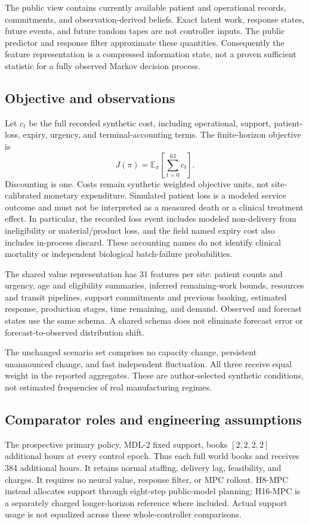 \documentclass[preprint,review,12pt]{elsarticle}
\begin{document}
The public view contains currently available patient and operational records,
commitments, and observation-derived beliefs. Exact latent work, response
states, future events, and future random tapes are not controller inputs.
The public predictor and response filter approximate these quantities.
Consequently the feature representation is a compressed information state,
not a proven sufficient statistic for a fully observed Markov decision process.

\subsection{Objective and observations}
Let $c_t$ be the full recorded synthetic cost, including operational,
support, patient-loss, expiry, urgency, and terminal-accounting terms.
The finite-horizon objective is
\begin{equation}
J(\pi)=\mathbb{E}_{\pi}\!\left[\sum_{t=0}^{63}c_t\right].
\label{eq:support-objective}
\end{equation}
Discounting is one. Costs remain synthetic weighted objective units, not
site-calibrated monetary expenditure. Simulated patient loss is a modeled
service outcome and must not be interpreted as a measured death or a
clinical treatment effect.
In particular, the recorded loss event includes modeled non-delivery from
ineligibility or material/product loss, and the field named expiry cost
also includes in-process discard. These accounting names do not identify
clinical mortality or independent biological batch-failure probabilities.

The shared value representation has 31 features per site: patient counts
and urgency, age and eligibility summaries, inferred remaining-work bounds,
resources and transit pipelines, support commitments and previous booking,
estimated response, production stages, time remaining, and demand.
Observed and forecast states use the same schema. A shared schema does
not eliminate forecast error or forecast-to-observed distribution shift.

The unchanged scenario set comprises no capacity change, persistent
unannounced change, and fast independent fluctuation. All three receive
equal weight in the reported aggregates. These are author-selected
synthetic conditions, not estimated frequencies of real manufacturing regimes.

\subsection{Comparator roles and engineering assumptions}
The prospective primary policy, MDL-2 fixed support, books
$[2,2,2,2]$ additional hours at every control epoch. Thus each full world
books and receives 384 additional hours. It retains normal staffing,
delivery lag, feasibility, and charges. It requires no neural value,
response filter, or MPC rollout. H8-MPC instead allocates support through
eight-step public-model planning; H16-MPC is a separately charged
longer-horizon reference where included. Actual support usage is not
equalized across these whole-controller comparisons.
\end{document}
